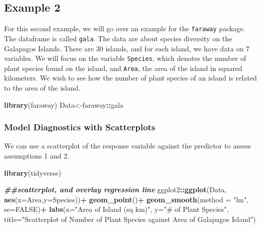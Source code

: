 \documentclass[
]{book}
\newenvironment{Shaded}{\begin{snugshade}}{\end{snugshade}}
\newcommand{\AttributeTok}[1]{\textcolor[rgb]{0.13,0.29,0.53}{#1}}
\newcommand{\ConstantTok}[1]{\textcolor[rgb]{0.56,0.35,0.01}{#1}}
\newcommand{\DocumentationTok}[1]{\textcolor[rgb]{0.56,0.35,0.01}{\textbf{\textit{#1}}}}
\newcommand{\FunctionTok}[1]{\textcolor[rgb]{0.13,0.29,0.53}{\textbf{#1}}}
\newcommand{\NormalTok}[1]{#1}
\newcommand{\OtherTok}[1]{\textcolor[rgb]{0.56,0.35,0.01}{#1}}
\newcommand{\SpecialCharTok}[1]{\textcolor[rgb]{0.81,0.36,0.00}{\textbf{#1}}}
\newcommand{\StringTok}[1]{\textcolor[rgb]{0.31,0.60,0.02}{#1}}
\begin{document}
\hypertarget{example-2}{%
\subsection{Example 2}\label{example-2}}

For this second example, we will go over an example for the \texttt{faraway} package. The dataframe is called \texttt{gala}. The data are about species diversity on the Galapagos Islands. There are 30 islands, and for each island, we have data on 7 variables. We will focus on the variable \texttt{Species}, which denotes the number of plant species found on the island, and \texttt{Area}, the area of the island in squared kilometers. We wish to see how the number of plant species of an island is related to the area of the island.

\begin{Shaded}
\begin{Highlighting}[]
\FunctionTok{library}\NormalTok{(faraway)}
\NormalTok{Data}\OtherTok{\textless{}{-}}\NormalTok{faraway}\SpecialCharTok{::}\NormalTok{gala}
\end{Highlighting}
\end{Shaded}

\hypertarget{model-diagnostics-with-scatterplots-1}{%
\subsubsection*{Model Diagnostics with Scatterplots}\label{model-diagnostics-with-scatterplots-1}}

We can use a scatterplot of the response variable against the predictor to assess assumptions 1 and 2.

\begin{Shaded}
\begin{Highlighting}[]
\FunctionTok{library}\NormalTok{(tidyverse)}

\DocumentationTok{\#\#scatterplot, and overlay regression line}
\NormalTok{ggplot2}\SpecialCharTok{::}\FunctionTok{ggplot}\NormalTok{(Data, }\FunctionTok{aes}\NormalTok{(}\AttributeTok{x=}\NormalTok{Area,}\AttributeTok{y=}\NormalTok{Species))}\SpecialCharTok{+}
  \FunctionTok{geom\_point}\NormalTok{()}\SpecialCharTok{+}
  \FunctionTok{geom\_smooth}\NormalTok{(}\AttributeTok{method =} \StringTok{"lm"}\NormalTok{, }\AttributeTok{se=}\ConstantTok{FALSE}\NormalTok{)}\SpecialCharTok{+}
  \FunctionTok{labs}\NormalTok{(}\AttributeTok{x=}\StringTok{"Area of Island (sq km)"}\NormalTok{, }\AttributeTok{y=}\StringTok{"\# of Plant Species"}\NormalTok{, }
       \AttributeTok{title=}\StringTok{"Scatterplot of Number of Plant Species against Area of Galapagos Island"}\NormalTok{)}
\end{Highlighting}
\end{Shaded}
\end{document}

